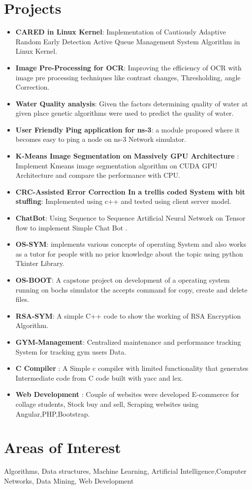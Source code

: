 \documentclass[letterpaper,11pt]{article}
\newcommand{\resumeItem}[2]{
  \item\small{
    \textbf{#1}{: #2 \vspace{-2pt}}
  }
}
\newcommand{\resumeSubItem}[2]{\resumeItem{#1}{#2}\vspace{-4pt}}
\newcommand{\resumeSubHeadingListStart}{\begin{itemize}[leftmargin=*]}
\newcommand{\resumeSubHeadingListEnd}{\end{itemize}}
\begin{document}
\section{Projects}
  \resumeSubHeadingListStart
    \resumeSubItem{CARED in Linux Kernel}
      {Implementation of Cautiously Adaptive Random Early Detection Active Queue Management System Algorithm in Linux
Kernel.}
    \resumeSubItem{Image Pre-Processing for OCR}
      {Improving the efficiency of OCR with image pre processing techniques like contrast changes, Thresholding, angle Correction.}
     \resumeSubItem{Water Quality analysis}
      {Given the factors determining quality of water at given place genetic algorithms were used to predict the quality of water.}
    \resumeSubItem{User Friendly Ping application for ns-3}
      {a module proposed where it becomes easy to ping a node on ns-3 Network simulator.}
    \resumeSubItem{K-Means Image Segmentation on Massively GPU Architecture }
      {Implement Kmeans image segmentation algorithm on CUDA GPU Architecture and compare the performance with CPU.}
    \resumeSubItem{CRC-Assisted Error Correction In a trellis coded System with bit stuffing}
      {Implemented using c++ and tested using client server model.}
     \resumeSubItem{ChatBot}
      {Using Sequence to Sequence Artificial Neural Network on Tensor flow to implement Simple Chat Bot .}
     \resumeSubItem{OS-SYM}
      {implements various concepts of operating System and also
works as a tutor for people with no prior knowledge about the topic using python Tkinter Library.}
     \resumeSubItem{OS-BOOT}
     {A capstone project on development of a operating system running on bochs simulator the accepts command for copy, create and delete files.}
    \resumeSubItem{RSA-SYM}
     {A simple C++ code to show the working of RSA Encryption Algorithm.}
    \resumeSubItem{GYM-Management}
     {Centralized maintenance and performance tracking System for tracking gym users Data.}
    \resumeSubItem{C Compiler }
     {A Simple c compiler with limited functionality that generates Intermediate code from C code built with yacc and lex.}
    \resumeSubItem{Web Development }
     {Couple of websites were developed E-commerce for collage students, Stock buy and sell, Scraping websites using Angular,PHP,Bootstrap. }
    
  \resumeSubHeadingListEnd


\section{Areas of Interest}
{Algorithms, Data structures, Machine Learning, Artificial Intelligence,Computer Networks, Data Mining, Web Development}
\end{document}
